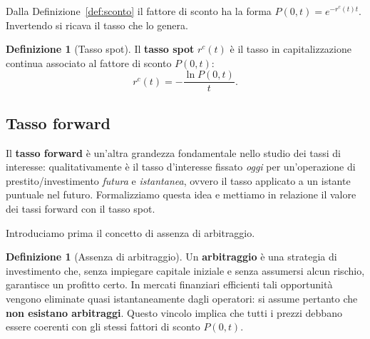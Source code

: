 \documentclass[11pt,a4paper]{article}
\theoremstyle{plain}
\theoremstyle{definition}
\newtheorem{definizione}[teorema]{Definizione}
\theoremstyle{remark}
\begin{document}
Dalla Definizione~\ref{def:sconto} il fattore di sconto ha la forma $P(0,t)=e^{-r^c(t)t}$.
Invertendo si ricava il tasso che lo genera.

\begin{definizione}[Tasso spot]
\label{def:spot}
Il \textbf{tasso spot} $r^c(t)$ \`e il tasso in capitalizzazione continua associato al
fattore di sconto $P(0,t)$:
\begin{equation}
  r^c(t) = -\frac{\ln P(0,t)}{t}.
  \label{eq:spot-inv}
\end{equation}
\end{definizione}



\subsection{Tasso forward}

Il \textbf{tasso forward} \`e un'altra grandezza fondamentale nello studio dei tassi di
interesse: qualitativamente \`e il tasso d'interesse fissato \emph{oggi} per un'operazione di
prestito/investimento \emph{futura} e \emph{istantanea}, ovvero il tasso applicato a un istante
puntuale nel futuro. Formalizziamo questa idea e mettiamo in relazione il valore dei tassi
forward con il tasso spot.

Introduciamo prima il concetto di assenza di arbitraggio.
\begin{definizione}[Assenza di arbitraggio]
\label{def:noarb}
Un \textbf{arbitraggio} \`e una strategia di investimento che, senza impiegare capitale
iniziale e senza assumersi alcun rischio, garantisce un profitto certo. In mercati
finanziari efficienti tali opportunit\`a vengono eliminate quasi istantaneamente dagli
operatori: si assume pertanto che \textbf{non esistano arbitraggi}. Questo vincolo implica
che tutti i prezzi debbano essere coerenti con gli stessi fattori di sconto $P(0,t)$.
\end{definizione}
\end{document}
